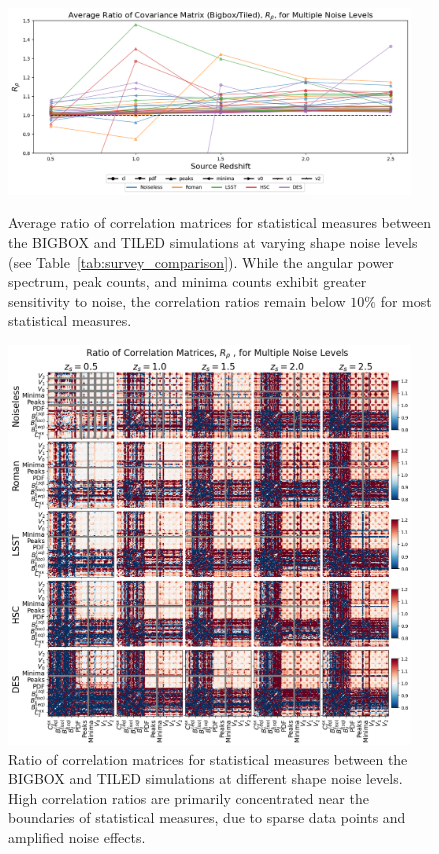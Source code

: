 \begin{figure}[p]
    \centering
    \includegraphics[width=0.95\textwidth]{figures/results/avg_corr_ratio_noise.png}
    \caption[Average BIGBOX/TILED Ratio of Correlation for Multiple Noise Levels]
    {Average ratio of correlation matrices for statistical measures between the BIGBOX and TILED simulations at varying shape noise levels (see Table~\ref{tab:survey_comparison}). While the angular power spectrum, peak counts, and minima counts exhibit greater sensitivity to noise, the correlation ratios remain below $10\%$ for most statistical measures.}
    \label{fig:avg_corr_noise}
    \includegraphics[width=0.95\textwidth]{figures/results/corr_noise.png}
    \caption[BIGBOX/TILED Ratio of Correlation for Multiple Noise Levels]
    {Ratio of correlation matrices for statistical measures between the BIGBOX and TILED simulations at different shape noise levels. High correlation ratios are primarily concentrated near the boundaries of statistical measures, due to sparse data points and amplified noise effects.}
    \label{fig:corr_noise}
\end{figure}

